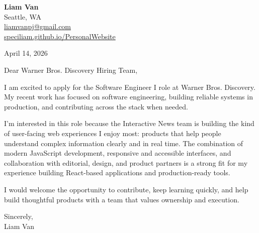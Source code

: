 \documentclass[letterpaper,11pt]{article}
\begin{document}
\begin{flushleft}
\textbf{\Large Liam Van} \\
Seattle, WA \\
\href{mailto:liamvanpj@gmail.com}{liamvanpj@gmail.com} \\
\href{https://speciliam.github.io/PersonalWebsite}{speciliam.github.io/PersonalWebsite}
\end{flushleft}

April 14, 2026

\noindent Dear Warner Bros. Discovery Hiring Team,

\noindent I am excited to apply for the Software Engineer I role at Warner Bros. Discovery. My recent work has focused on software engineering, building reliable systems in production, and contributing across the stack when needed.

\noindent I'm interested in this role because the Interactive News team is building the kind of user-facing web experiences I enjoy most: products that help people understand complex information clearly and in real time. The combination of modern JavaScript development, responsive and accessible interfaces, and collaboration with editorial, design, and product partners is a strong fit for my experience building React-based applications and production-ready tools.

\noindent I would welcome the opportunity to contribute, keep learning quickly, and help build thoughtful products with a team that values ownership and execution.

\noindent Sincerely, \\
Liam Van
\end{document}
